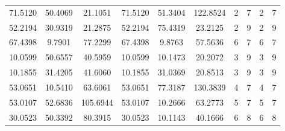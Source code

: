 \documentclass[withoutpreface,bwprint]{cumcmthesis}
\begin{document}
\begin{appendices}
\begin{table}[htbp!]
\begin{tabular}{@{}cccccccccc@{}}
				71.5120                          & 50.4069                          & 21.1051                          & 71.5120                          & 51.3404                          & 122.8524                         & 2                    & 7                    & 2                      & 7                      \\
				52.2194                          & 30.9319                          & 21.2875                          & 52.2194                          & 75.4319                          & 23.2125                          & 2                    & 9                    & 2                      & 9                      \\
				67.4398                          & 9.7901                           & 77.2299                          & 67.4398                          & 9.8763                           & 57.5636                          & 6                    & 7                    & 6                      & 7                      \\
				10.0599                          & 50.6557                          & 40.5959                          & 10.0599                          & 10.1473                          & 20.2072                          & 3                    & 9                    & 3                      & 9                      \\
				10.1855                          & 31.4205                          & 41.6060                          & 10.1855                          & 31.0369                          & 20.8513                          & 3                    & 9                    & 3                      & 9                      \\
				53.0651                          & 10.5410                          & 63.6061                          & 53.0651                          & 77.3187                          & 130.3839                         & 4                    & 7                    & 4                      & 7                      \\
				53.0107                          & 52.6836                          & 105.6944                         & 53.0107                          & 10.2666                          & 63.2773                          & 5                    & 7                    & 5                      & 7                      \\
				30.0523                          & 50.3392                          & 80.3915                          & 30.0523                          & 10.1143                          & 40.1666                          & 6                    & 8                    & 6                      & 8                      \\

\end{tabular}
\end{table}
\end{appendices}
\end{document}
